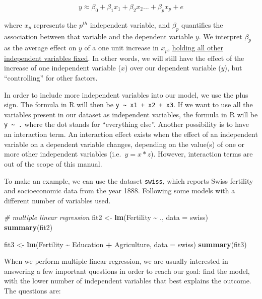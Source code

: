 \documentclass[
]{svmono}
\newenvironment{Shaded}{\begin{snugshade}}{\end{snugshade}}
\newcommand{\AttributeTok}[1]{\textcolor[rgb]{0.13,0.29,0.53}{#1}}
\newcommand{\CommentTok}[1]{\textcolor[rgb]{0.56,0.35,0.01}{\textit{#1}}}
\newcommand{\FunctionTok}[1]{\textcolor[rgb]{0.13,0.29,0.53}{\textbf{#1}}}
\newcommand{\NormalTok}[1]{#1}
\newcommand{\OtherTok}[1]{\textcolor[rgb]{0.56,0.35,0.01}{#1}}
\newcommand{\SpecialCharTok}[1]{\textcolor[rgb]{0.81,0.36,0.00}{\textbf{#1}}}
\begin{document}
\begin{equation}
y\approx\beta_0+\beta_1x_1+\beta_2x_2...+\beta_px_p+e
\label{eq:mlr}
\end{equation}

where \(x_p\) represents the \(p^{th}\) independent variable, and \(\beta_p\)
quantifies the association between that variable and the dependent
variable \(y\). We interpret \(\beta_p\) as the average effect on \(y\) of a
one unit increase in \(x_p\), \ul{holding all other independent variables
fixed}. In other words, we will still have the effect of the
increase of one independent variable (\(x\)) over our dependent variable
(\(y\)), but ``controlling'' for other factors.

In order to include more independent variables into our model, we use
the plus sign. The formula in R will then be \texttt{y\ \textasciitilde{}\ x1\ +\ x2\ +\ x3}. If we
want to use all the variables present in our dataset as independent
variables, the formula in R will be \texttt{y\ \textasciitilde{}\ .} where the dot stands for
``everything else''. Another possibility is to have an interaction term.
An interaction effect exists when the effect of an independent variable
on a dependent variable changes, depending on the value(s) of one or
more other independent variables (i.e.~\(y=x*z\)). However, interaction
terms are out of the scope of this manual.

To make an example, we can use the dataset \texttt{swiss}, which reports Swiss
fertility and socioeconomic data from the year 1888. Following some
models with a different number of variables used.

\begin{Shaded}
\begin{Highlighting}[]
\CommentTok{\# multiple linear regression}
\NormalTok{fit2 }\OtherTok{\textless{}{-}} \FunctionTok{lm}\NormalTok{(Fertility }\SpecialCharTok{\textasciitilde{}}\NormalTok{ ., }\AttributeTok{data =}\NormalTok{ swiss)}
\FunctionTok{summary}\NormalTok{(fit2)}

\NormalTok{fit3 }\OtherTok{\textless{}{-}} \FunctionTok{lm}\NormalTok{(Fertility }\SpecialCharTok{\textasciitilde{}}\NormalTok{ Education }\SpecialCharTok{+}\NormalTok{ Agriculture, }\AttributeTok{data =}\NormalTok{ swiss)}
\FunctionTok{summary}\NormalTok{(fit3)}
\end{Highlighting}
\end{Shaded}

When we perform multiple linear regression, we are usually interested in
answering a few important questions in order to reach our goal: find the
model, with the lower number of independent variables that best explains
the outcome. The questions are:
\end{document}
